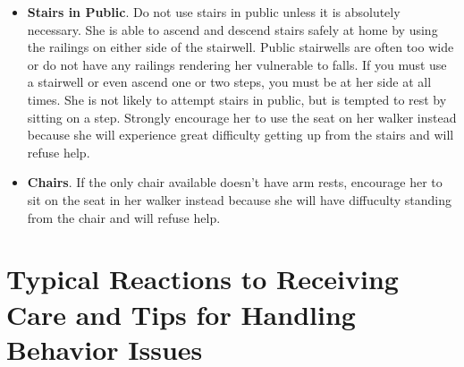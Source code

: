 \documentclass[]{article}
\begin{document}
\begin{itemize}
\item \textbf{Stairs in Public}. Do not use stairs in public unless it is absolutely necessary. She is able to ascend and descend stairs safely at home by using the railings on either side of the stairwell. Public stairwells are often too wide or do not have any railings rendering her vulnerable to falls. If you must use a stairwell or even ascend one or two steps, you must be at her side at all times. She is not likely to attempt stairs in public, but is tempted to rest by sitting on a step. Strongly encourage her to use the seat on her walker instead because she will experience great difficulty getting up from the stairs and will refuse help.
\item \textbf{Chairs}. If the only chair available doesn't have arm rests, encourage her to sit on the seat in her walker instead because she will have diffuculty standing from the chair and will refuse help.
\end{itemize}

\section*{Typical Reactions to Receiving Care and Tips for Handling Behavior Issues}
\end{document}
